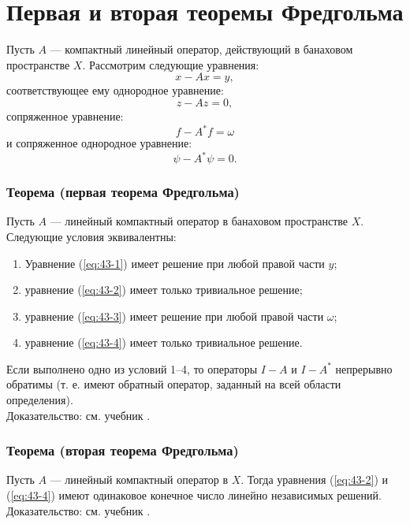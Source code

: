 \section{Первая и вторая теоремы Фредгольма}
\label{sec:q-43}

Пусть $A$ --- компактный линейный оператор, действующий в банаховом пространстве $X$. Рассмотрим следующие уравнения:
\begin{equation}
	x - Ax = y,
	\label{eq:43-1}
\end{equation}
соответствующее ему однородное уравнение:
\begin{equation}
	z - Az = 0,
	\label{eq:43-2}
\end{equation}
сопряженное уравнение:
\begin{equation}
	f - A^*f = \omega
	\label{eq:43-3}
\end{equation}
и сопряженное однородное уравнение:
\begin{equation}
	\psi - A^*\psi = 0.
	\label{eq:43-4}
\end{equation}

\subsubsection*{Теорема (первая теорема Фредгольма)}
Пусть $A$ --- линейный компактный оператор в банаховом пространстве $X$. Следующие условия эквивалентны:
\begin{enumerate}
	\itemsep0pt
	\item Уравнение (\ref{eq:43-1}) имеет решение при любой правой части $y$;
	\item уравнение (\ref{eq:43-2}) имеет только тривиальное решение;
	\item уравнение (\ref{eq:43-3}) имеет решение при любой правой части $\omega$;
	\item уравнение (\ref{eq:43-4}) имеет только тривиальное решение.
\end{enumerate}
Если выполнено одно из условий 1--4, то операторы $I - A$ и $I - A^*$ непрерывно обратимы (т. е. имеют обратный оператор, заданный на всей области определения).\\
Доказательство: см. учебник \cite[с.~212]{trenogin}.

\subsubsection*{Теорема (вторая теорема Фредгольма)}
Пусть $A$ --- линейный компактный оператор в $X$. Тогда уравнения (\ref{eq:43-2}) и (\ref{eq:43-4}) имеют одинаковое конечное число линейно независимых решений.\\
Доказательство: см. учебник \cite[с.~213]{trenogin}.
